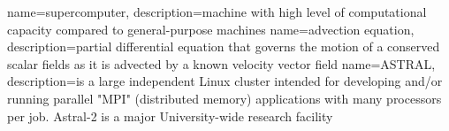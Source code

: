 

{
	name={supercomputer},
	description={machine with high level of computational capacity compared to general-purpose machines}
}
{
	name={advection equation},
	description={partial differential equation that governs the motion of a conserved scalar fields as it is advected by a known velocity vector field}
}
{
	name={ASTRAL},
	description={is a large independent Linux cluster intended for developing and/or running parallel "MPI" (distributed memory) applications with many processors per job. Astral-2 is a major University-wide research facility}
}
